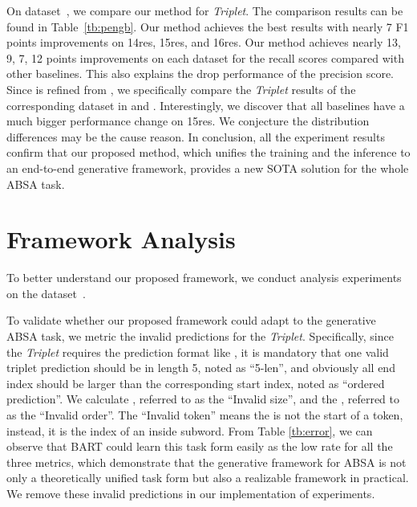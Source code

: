 \documentclass[11pt,a4paper]{article}
\begin{document}
On  dataset~\citep{DBLP:conf/emnlp/XuLLB20}, we compare our method for \emph{Triplet}. The comparison results can be found in Table~\ref{tb:pengb}. Our method achieves the best results with nearly 7 F1 points improvements on 14res, 15res, and 16res. Our method achieves nearly 13, 9, 7, 12 points improvements on each dataset for the recall scores compared with other baselines. This also explains the drop performance of the precision score. Since  is  refined from , we specifically compare the \emph{Triplet} results of the corresponding dataset in  and . Interestingly, we discover that all baselines have a much bigger performance change on 15res. We conjecture the distribution differences may be the cause reason. In conclusion, all the experiment results confirm that our proposed method, which unifies the training and the inference to an  end-to-end generative framework, provides a new SOTA solution for the whole ABSA task.




















\section{Framework Analysis}
\label{sec:ana}
To better understand our proposed framework, we conduct analysis experiments on the  dataset~\citep{DBLP:conf/emnlp/XuLLB20}.

To validate whether our proposed framework could adapt to the generative ABSA task, we metric the invalid predictions for the \emph{Triplet}. Specifically, since the \emph{Triplet} requires the prediction format like , it is mandatory that one valid triplet prediction should be in length 5, noted as ``5-len'', and obviously all end index should be larger than the corresponding start index, noted as ``ordered prediction''. We calculate , referred to as the ``Invalid size'', and the , referred to as the ``Invalid order''.  The ``Invalid token'' means the  is not the start of a token, instead, it is the index of an inside subword. From Table \ref{tb:error}, we can observe that BART could learn this task form easily as the low rate for all the three metrics, which demonstrate that the generative framework for ABSA is not only a theoretically unified task form but also  a realizable framework in practical. We remove these invalid predictions in our implementation of experiments.
\end{document}
